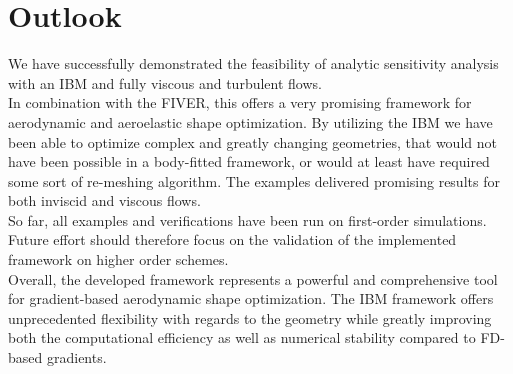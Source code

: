 \documentclass[../main.tex]{subfiles}
\begin{document}
\section{Outlook}\label{sec:outlook}
We have successfully demonstrated the feasibility of  analytic sensitivity analysis with an \acf{IBM} and fully viscous and turbulent flows.\\
In combination with the \acf{FIVER}, this offers a very promising framework for aerodynamic and aeroelastic shape optimization. By utilizing the \ac{IBM} we have been able to optimize complex and greatly changing geometries, that would not have been possible in a body-fitted framework, or would at least have required some sort of re-meshing algorithm. The examples delivered promising results for both inviscid and viscous flows.\\
So far, all examples and verifications have been run on first-order simulations. Future effort should therefore focus on the validation of the implemented framework on higher order schemes.\\
Overall, the developed framework represents a powerful and comprehensive tool for gradient-based aerodynamic shape optimization. The \ac{IBM} framework offers unprecedented flexibility with regards to the geometry while greatly improving both the computational efficiency as well as numerical stability compared to \ac{FD}-based gradients.
\end{document}
